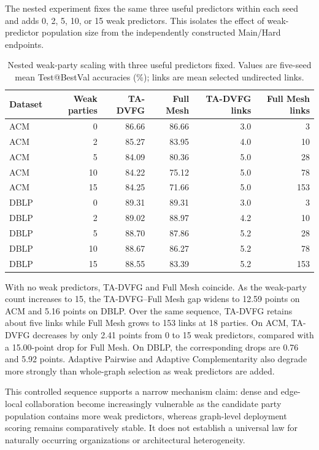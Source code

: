 \documentclass[letterpaper]{article}
\newcommand{\method}{\textsc{TA-DVFG}}
\begin{document}
The nested experiment fixes the same three useful predictors within each seed
and adds 0, 2, 5, 10, or 15 weak predictors. This isolates the effect of
weak-predictor population size from the independently constructed Main/Hard
endpoints.

\begin{table}[!t]
\centering
\scriptsize
\setlength{\tabcolsep}{4.0pt}
\caption{Nested weak-party scaling with three useful predictors fixed.
Values are five-seed mean Test@BestVal accuracies (\%); links are mean selected
undirected links.}
\label{tab:supp-weak-scaling}
\begin{tabular}{lrrrrr}
\toprule
Dataset & Weak parties & \method{} & Full Mesh & \method{} links & Full Mesh links \\
\midrule
ACM & 0  & 86.66 & 86.66 & 3.0 & 3 \\
ACM & 2  & 85.27 & 83.95 & 4.0 & 10 \\
ACM & 5  & 84.09 & 80.36 & 5.0 & 28 \\
ACM & 10 & 84.22 & 75.12 & 5.0 & 78 \\
ACM & 15 & 84.25 & 71.66 & 5.0 & 153 \\
\midrule
DBLP & 0  & 89.31 & 89.31 & 3.0 & 3 \\
DBLP & 2  & 89.02 & 88.97 & 4.2 & 10 \\
DBLP & 5  & 88.70 & 87.86 & 5.2 & 28 \\
DBLP & 10 & 88.67 & 86.27 & 5.2 & 78 \\
DBLP & 15 & 88.55 & 83.39 & 5.2 & 153 \\
\bottomrule
\end{tabular}
\end{table}

With no weak predictors, \method{} and Full Mesh coincide. As the weak-party
count increases to 15, the \method{}--Full Mesh gap widens to 12.59 points on
ACM and 5.16 points on DBLP. Over the same sequence, \method{} retains about
five links while Full Mesh grows to 153 links at 18 parties. On ACM, \method{}
decreases by only 2.41 points from 0 to 15 weak predictors, compared with a
15.00-point drop for Full Mesh. On DBLP, the corresponding drops are 0.76 and
5.92 points. Adaptive Pairwise and Adaptive Complementarity also degrade more
strongly than whole-graph selection as weak predictors are added.

This controlled sequence supports a narrow mechanism claim: dense and
edge-local collaboration become increasingly vulnerable as the candidate party
population contains more weak predictors, whereas graph-level deployment
scoring remains comparatively stable. It does not establish a universal law
for naturally occurring organizations or architectural heterogeneity.
\end{document}
